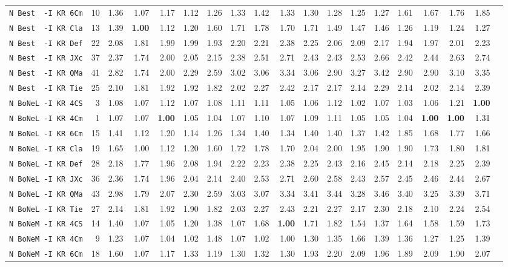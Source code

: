 \begin{tabular}{l | r @{~~} r | r@{~~}r@{~~}r@{~~}r@{~~}r@{~~}r@{~~}r@{~~}r@{~~}r@{~~}r@{~~}r@{~~}r@{~~}r@{~~}r@{~~}r@{~~}r|}
\verb+N Best  -I KR 6Cm+ & 10 & 1.36 & 1.07&1.17&1.12&1.26&1.33&1.42&1.33&1.30&1.28&1.25&1.27&1.61&1.67&1.76&1.85\\
\verb+N Best  -I KR Cla+ & 13 & 1.39 & \textbf{1.00}&1.12&1.20&1.60&1.71&1.78&1.70&1.71&1.49&1.47&1.46&1.26&1.19&1.24&1.27\\
\verb+N Best  -I KR Def+ & 22 & 2.08 & 1.81&1.99&1.99&1.93&2.20&2.21&2.38&2.25&2.06&2.09&2.17&1.94&1.97&2.01&2.23\\
\verb+N Best  -I KR JXc+ & 37 & 2.37 & 1.74&2.00&2.05&2.15&2.38&2.51&2.71&2.43&2.43&2.53&2.66&2.42&2.44&2.63&2.74\\
\verb+N Best  -I KR QMa+ & 41 & 2.82 & 1.74&2.00&2.29&2.59&3.02&3.06&3.34&3.06&2.90&3.27&3.42&2.90&2.90&3.10&3.35\\
\verb+N Best  -I KR Tie+ & 25 & 2.10 & 1.81&1.92&1.92&1.82&2.02&2.27&2.42&2.17&2.17&2.14&2.29&2.14&2.02&2.14&2.39\\
\verb+N BoNeL -I KR 4CS+ & 3 & 1.08 & 1.07&1.12&1.07&1.08&1.11&1.11&1.05&1.06&1.12&1.02&1.07&1.03&1.06&1.21&\textbf{1.00}\\
\verb+N BoNeL -I KR 4Cm+ & 1 & 1.07 & 1.07&\textbf{1.00}&1.05&1.04&1.07&1.10&1.07&1.09&1.11&1.05&1.05&1.04&\textbf{1.00}&\textbf{1.00}&1.31\\
\verb+N BoNeL -I KR 6Cm+ & 15 & 1.41 & 1.12&1.20&1.14&1.26&1.34&1.40&1.34&1.40&1.40&1.37&1.42&1.85&1.68&1.77&1.66\\
\verb+N BoNeL -I KR Cla+ & 19 & 1.65 & 1.00&1.12&1.20&1.60&1.72&1.78&1.70&2.04&2.00&1.95&1.90&1.90&1.73&1.80&1.81\\
\verb+N BoNeL -I KR Def+ & 28 & 2.18 & 1.77&1.96&2.08&1.94&2.22&2.23&2.38&2.25&2.43&2.16&2.45&2.14&2.18&2.25&2.39\\
\verb+N BoNeL -I KR JXc+ & 36 & 2.36 & 1.74&1.96&2.04&2.14&2.40&2.53&2.71&2.60&2.58&2.43&2.57&2.45&2.46&2.44&2.67\\
\verb+N BoNeL -I KR QMa+ & 43 & 2.98 & 1.79&2.07&2.30&2.59&3.03&3.07&3.34&3.41&3.44&3.28&3.46&3.40&3.25&3.39&3.71\\
\verb+N BoNeL -I KR Tie+ & 27 & 2.14 & 1.81&1.92&1.90&1.82&2.03&2.27&2.43&2.21&2.27&2.17&2.30&2.18&2.10&2.24&2.54\\
\verb+N BoNeM -I KR 4CS+ & 14 & 1.40 & 1.07&1.05&1.20&1.38&1.07&1.68&\textbf{1.00}&1.71&1.82&1.54&1.37&1.64&1.58&1.59&1.73\\
\verb+N BoNeM -I KR 4Cm+ & 9 & 1.23 & 1.07&1.04&1.02&1.48&1.07&1.02&1.00&1.30&1.35&1.66&1.39&1.36&1.27&1.25&1.39\\
\verb+N BoNeM -I KR 6Cm+ & 18 & 1.60 & 1.07&1.17&1.33&1.19&1.30&1.32&1.30&1.93&2.20&2.09&1.96&1.89&2.09&1.90&2.07\\

\end{tabular}
